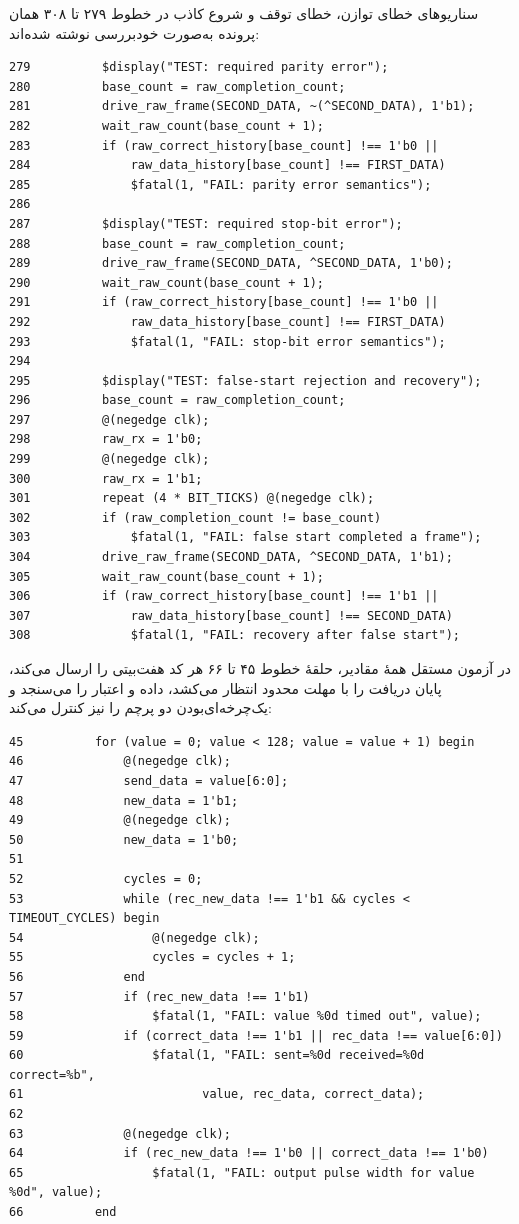 سناریوهای خطای توازن، خطای توقف و شروع کاذب در خطوط ۲۷۹ تا ۳۰۸ همان پرونده به‌صورت
خودبررسی نوشته شده‌اند:

\begin{dsdlcodeblock}
\begin{verbatim}
279          $display("TEST: required parity error");
280          base_count = raw_completion_count;
281          drive_raw_frame(SECOND_DATA, ~(^SECOND_DATA), 1'b1);
282          wait_raw_count(base_count + 1);
283          if (raw_correct_history[base_count] !== 1'b0 ||
284              raw_data_history[base_count] !== FIRST_DATA)
285              $fatal(1, "FAIL: parity error semantics");
286
287          $display("TEST: required stop-bit error");
288          base_count = raw_completion_count;
289          drive_raw_frame(SECOND_DATA, ^SECOND_DATA, 1'b0);
290          wait_raw_count(base_count + 1);
291          if (raw_correct_history[base_count] !== 1'b0 ||
292              raw_data_history[base_count] !== FIRST_DATA)
293              $fatal(1, "FAIL: stop-bit error semantics");
294
295          $display("TEST: false-start rejection and recovery");
296          base_count = raw_completion_count;
297          @(negedge clk);
298          raw_rx = 1'b0;
299          @(negedge clk);
300          raw_rx = 1'b1;
301          repeat (4 * BIT_TICKS) @(negedge clk);
302          if (raw_completion_count != base_count)
303              $fatal(1, "FAIL: false start completed a frame");
304          drive_raw_frame(SECOND_DATA, ^SECOND_DATA, 1'b1);
305          wait_raw_count(base_count + 1);
306          if (raw_correct_history[base_count] !== 1'b1 ||
307              raw_data_history[base_count] !== SECOND_DATA)
308              $fatal(1, "FAIL: recovery after false start");
\end{verbatim}
\end{dsdlcodeblock}

در آزمون مستقل همهٔ مقادیر، حلقهٔ خطوط ۴۵ تا ۶۶ هر کد هفت‌بیتی را ارسال می‌کند، پایان
دریافت را با مهلت محدود انتظار می‌کشد، داده و اعتبار را می‌سنجد و یک‌چرخه‌ای‌بودن دو پرچم
را نیز کنترل می‌کند:

\begin{dsdlcodeblock}
\begin{verbatim}
45          for (value = 0; value < 128; value = value + 1) begin
46              @(negedge clk);
47              send_data = value[6:0];
48              new_data = 1'b1;
49              @(negedge clk);
50              new_data = 1'b0;
51
52              cycles = 0;
53              while (rec_new_data !== 1'b1 && cycles < TIMEOUT_CYCLES) begin
54                  @(negedge clk);
55                  cycles = cycles + 1;
56              end
57              if (rec_new_data !== 1'b1)
58                  $fatal(1, "FAIL: value %0d timed out", value);
59              if (correct_data !== 1'b1 || rec_data !== value[6:0])
60                  $fatal(1, "FAIL: sent=%0d received=%0d correct=%b",
61                         value, rec_data, correct_data);
62
63              @(negedge clk);
64              if (rec_new_data !== 1'b0 || correct_data !== 1'b0)
65                  $fatal(1, "FAIL: output pulse width for value %0d", value);
66          end
\end{verbatim}
\end{dsdlcodeblock}


